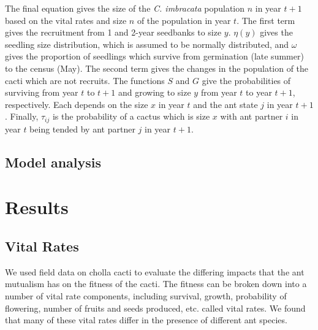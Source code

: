 \documentclass[12pt,a4paper]{article}
\begin{document}
The final equation gives the size of the \textit{C. imbracata} population $n$ in year $t+1$ based on the vital rates and size $n$ of the population in year $t$. The first term gives the recruitment from 1 and 2-year seedbanks to size $y$. $\eta(y)$ gives the seedling size distribution, which is assumed to be normally distributed, and $\omega$ gives the proportion of seedlings which survive from germination (late summer) to the census (May). The second term gives the changes in the population of the cacti which are not recruits. The functions $S$ and $G$ give the probabilities of surviving from year $t$ to $t+1$ and growing to size $y$ from year $t$ to year $t+1$, respectively. Each depends on the size $x$ in year $t$ and the ant state $j$ in year $t+1$. Finally, $\tau_{ij}$ is the probability of a cactus which is size $x$ with ant partner $i$ in year $t$ being tended by ant partner $j$ in year $t+1$. 

 \subsection*{Model analysis}



\section*{Results}
\subsection*{Vital Rates}

We used field data on cholla cacti to evaluate the differing impacts that the ant mutualism has on the fitness of the cacti. The fitness can be broken down into a number of vital rate components, including survival, growth, probability of flowering, number of fruits and seeds produced, etc. called vital rates. We found that many of these vital rates differ in the presence of different ant species. 
\end{document}
